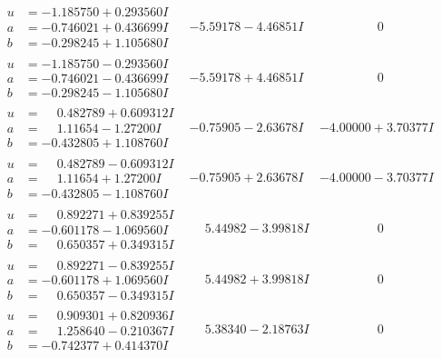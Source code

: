 \documentclass[1p]{elsarticle_modified}
\theoremstyle{definition}
\begin{document}
$$\begin{array}{c|c|c}
\begin{aligned}
u &= -1.185750 + 0.293560 I \\
a &= -0.746021 + 0.436699 I \\
b &= -0.298245 + 1.105680 I\end{aligned}
 & -5.59178 - 4.46851 I & \phantom{-0.000000 } 0 \\ \hline\begin{aligned}
u &= -1.185750 - 0.293560 I \\
a &= -0.746021 - 0.436699 I \\
b &= -0.298245 - 1.105680 I\end{aligned}
 & -5.59178 + 4.46851 I & \phantom{-0.000000 } 0 \\ \hline\begin{aligned}
u &= \phantom{-}0.482789 + 0.609312 I \\
a &= \phantom{-}1.11654 - 1.27200 I \\
b &= -0.432805 + 1.108760 I\end{aligned}
 & -0.75905 - 2.63678 I & -4.00000 + 3.70377 I \\ \hline\begin{aligned}
u &= \phantom{-}0.482789 - 0.609312 I \\
a &= \phantom{-}1.11654 + 1.27200 I \\
b &= -0.432805 - 1.108760 I\end{aligned}
 & -0.75905 + 2.63678 I & -4.00000 - 3.70377 I \\ \hline\begin{aligned}
u &= \phantom{-}0.892271 + 0.839255 I \\
a &= -0.601178 - 1.069560 I \\
b &= \phantom{-}0.650357 + 0.349315 I\end{aligned}
 & \phantom{-}5.44982 - 3.99818 I & \phantom{-0.000000 } 0 \\ \hline\begin{aligned}
u &= \phantom{-}0.892271 - 0.839255 I \\
a &= -0.601178 + 1.069560 I \\
b &= \phantom{-}0.650357 - 0.349315 I\end{aligned}
 & \phantom{-}5.44982 + 3.99818 I & \phantom{-0.000000 } 0 \\ \hline\begin{aligned}
u &= \phantom{-}0.909301 + 0.820936 I \\
a &= \phantom{-}1.258640 - 0.210367 I \\
b &= -0.742377 + 0.414370 I\end{aligned}
 & \phantom{-}5.38340 - 2.18763 I & \phantom{-0.000000 } 0 \\ \hline\begin{aligned}

\end{aligned}
\end{array}$$
\end{document}
